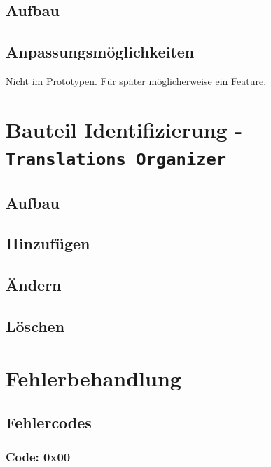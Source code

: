 \documentclass{book}
\newcommand{\assisttool}{\texttt{Translations Organizer}}
\begin{document}
		\section{Aufbau}
		\section{Anpassungsmöglichkeiten}
			Nicht im Prototypen. Für später möglicherweise ein Feature.
	\chapter{Bauteil Identifizierung - \assisttool}
		\label{Translations}
		\section{Aufbau}
		\section{Hinzufügen}
		\section{Ändern}
		\section{Löschen}
	\chapter{Fehlerbehandlung}
		\section{Fehlercodes}
			\subsection*{Code: 0x00}
\end{document}
